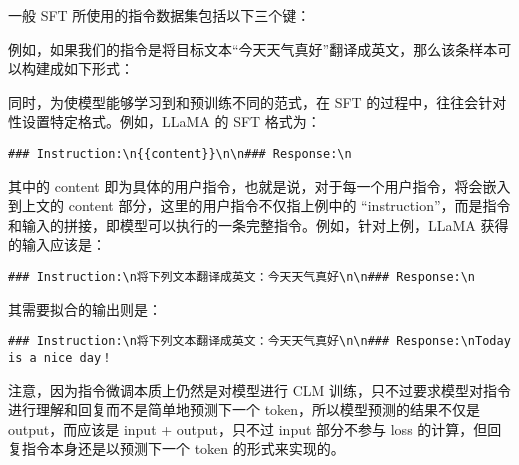 \documentclass[12pt,a4paper]{book}
\begin{document}
一般 SFT 所使用的指令数据集包括以下三个键：

\begin{Shaded}
\begin{Highlighting}[]
\FunctionTok{\{}
    \FunctionTok{:}\FunctionTok{,}
    \FunctionTok{:}\FunctionTok{,}
    \FunctionTok{:}
\FunctionTok{\}}
\end{Highlighting}
\end{Shaded}

例如，如果我们的指令是将目标文本``今天天气真好''翻译成英文，那么该条样本可以构建成如下形式：

\begin{Shaded}
\begin{Highlighting}[]
\FunctionTok{\{}
    \FunctionTok{:}\FunctionTok{,}
    \FunctionTok{:}\FunctionTok{,}
    \FunctionTok{:}
\FunctionTok{\}}
\end{Highlighting}
\end{Shaded}

同时，为使模型能够学习到和预训练不同的范式，在 SFT
的过程中，往往会针对性设置特定格式。例如，LLaMA 的 SFT 格式为：

\begin{verbatim}
### Instruction:\n{{content}}\n\n### Response:\n
\end{verbatim}

其中的 content
即为具体的用户指令，也就是说，对于每一个用户指令，将会嵌入到上文的
content 部分，这里的用户指令不仅指上例中的
``instruction''，而是指令和输入的拼接，即模型可以执行的一条完整指令。例如，针对上例，LLaMA
获得的输入应该是：

\begin{verbatim}
### Instruction:\n将下列文本翻译成英文：今天天气真好\n\n### Response:\n
\end{verbatim}

其需要拟合的输出则是：

\begin{verbatim}
### Instruction:\n将下列文本翻译成英文：今天天气真好\n\n### Response:\nToday is a nice day！
\end{verbatim}

注意，因为指令微调本质上仍然是对模型进行 CLM
训练，只不过要求模型对指令进行理解和回复而不是简单地预测下一个
token，所以模型预测的结果不仅是 output，而应该是 input + output，只不过
input 部分不参与 loss 的计算，但回复指令本身还是以预测下一个 token
的形式来实现的。
\end{document}
